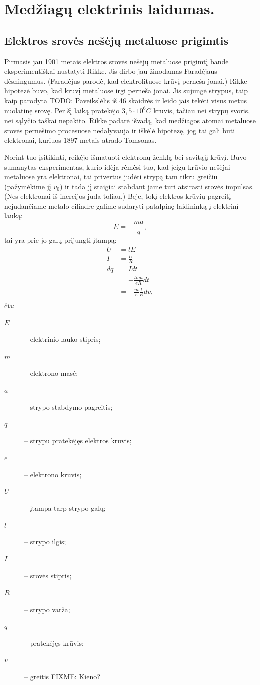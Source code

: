 \chapter{Medžiagų elektrinis laidumas.}

\section{Elektros srovės nešėjų metaluose prigimtis}

Pirmasis jau 1901 metais elektros srovės nešėjų metaluose prigimtį
bandė eksperimentiškai nustatyti Rikke. Jis dirbo jau žinodamas
Faradėjaus dėsningumus. (Faradėjus parodė, kad elektrolituose
krūvį perneša jonai.) Rikke hipotezė buvo, kad krūvį metaluose
irgi perneša jonai.  Jis sujungė strypus, taip kaip parodyta TODO:
Paveikslėlis iš 46 skaidrės ir leido jais tekėti visus metus
nuolatinę srovę. Per šį laiką pratekėjo $3,5\cdot 10^{6}C$
krūvis, tačiau nei strypų svoris, nei sąlyčio taškai nepakito.
Rikke padarė išvadą, kad medžiagos atomai metaluose srovės
pernešimo procesuose nedalyvauja ir iškėlė hipotezę, jog
tai gali būti elektronai, kuriuos 1897 metais atrado Tomsonas.

Norint tuo įsitikinti, reikėjo išmatuoti elektronų ženklą bei
savitąjį krūvį. Buvo sumanytas eksperimentas, kurio idėja rėmėsi
tuo, kad jeigu krūvio nešėjai metaluose yra elektronai,
tai privertus judėti strypą tam tikru greičiu (pažymėkime jį
$v_{0}$) ir tada jį staigiai stabdant jame turi atsirasti srovės
impulsas. (Nes elektronai iš inercijos juda toliau.) Beje, tokį
elektros krūvių pagreitį nejudančiame metalo cilindre galime
sudaryti patalpinę laidininką į elektrinį lauką:
\begin{equation*}
  E = -\frac{ma}{q},
\end{equation*}
tai yra prie jo galų prijungti įtampą:
\begin{align*}
  U &= lE \\
  I &= \frac{U}{R} \\
  dq
  &= Idt \\
  &= -\frac{lma}{eR}dt \\
  &= -\frac{m}{e}\frac{l}{R}dv, \\
\end{align*}
čia:
\begin{description}
  \item[$E$] – elektrinio lauko stipris;
  \item[$m$] – elektrono masė;
  \item[$a$] – strypo stabdymo pagreitis;
  \item[$q$] – strypu pratekėjęs elektros krūvis;
  \item[$e$] – elektrono krūvis;
  \item[$U$] – įtampa tarp strypo galų;
  \item[$l$] – strypo ilgis;
  \item[$I$] – srovės stipris;
  \item[$R$] – strypo varža;
  \item[$q$] – pratekėjęs krūvis;
  \item[$v$] – greitis FIXME: Kieno?
\end{description}

